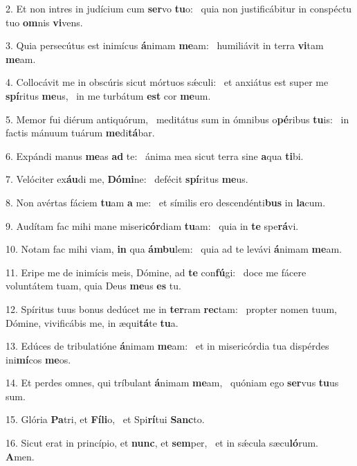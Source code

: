 2. Et non intres in judícium cum \textbf{ser}vo \textbf{tu}o: \ast\  quia non justificábitur in conspéctu tuo \textbf{om}nis \textbf{vi}vens.\

3. Quia persecútus est inimícus \textbf{á}nimam \textbf{me}am: \ast\  humiliávit in terra \textbf{vi}tam \textbf{me}am.\

4. Collocávit me in obscúris sicut mórtuos sǽculi: \dag\  et anxiátus est super me \textbf{spí}ritus \textbf{me}us, \ast\  in me turbátum \textbf{est} cor \textbf{me}um.\

5. Memor fui diérum antiquórum, \dag\  meditátus sum in ómnibus o\textbf{pé}ribus \textbf{tu}is: \ast\  in factis mánuum tuárum \textbf{me}di\textbf{tá}bar.\

6. Expándi manus \textbf{me}as \textbf{ad} te: \ast\  ánima mea sicut terra sine \textbf{a}qua \textbf{ti}bi.\

7. Velóciter ex\textbf{áu}di me, \textbf{Dó}\textbf{mi}ne: \ast\  defécit \textbf{spí}ritus \textbf{me}us.\

8. Non avértas fáciem \textbf{tu}am \textbf{a} me: \ast\  et símilis ero descendénti\textbf{bus} in \textbf{la}cum.\

9. Audítam fac mihi mane miseri\textbf{cór}diam \textbf{tu}am: \ast\  quia in \textbf{te} spe\textbf{rá}vi.\

10. Notam fac mihi viam, \textbf{in} qua \textbf{ám}\textbf{bu}lem: \ast\  quia ad te levávi \textbf{á}nimam \textbf{me}am.\

11. Eripe me de inimícis meis, Dómine, ad \textbf{te} con\textbf{fú}gi: \ast\  doce me fácere voluntátem tuam, quia Deus \textbf{me}us \textbf{es} tu.\

12. Spíritus tuus bonus dedúcet me in \textbf{ter}ram \textbf{rec}tam: \ast\  propter nomen tuum, Dómine, vivificábis me, in æqui\textbf{tá}te \textbf{tu}a.\

13. Edúces de tribulatióne \textbf{á}nimam \textbf{me}am: \ast\  et in misericórdia tua dispérdes ini\textbf{mí}cos \textbf{me}os.\

14. Et perdes omnes, qui tríbulant \textbf{á}nimam \textbf{me}am, \ast\  quóniam ego \textbf{ser}vus \textbf{tu}us sum.\

15. Glória \textbf{Pa}tri, et \textbf{Fí}\textbf{li}o, \ast\  et Spi\textbf{rí}tui \textbf{Sanc}to.\

16. Sicut erat in princípio, et \textbf{nunc}, et \textbf{sem}per, \ast\  et in sǽcula sæcu\textbf{ló}rum. \textbf{A}men.\

